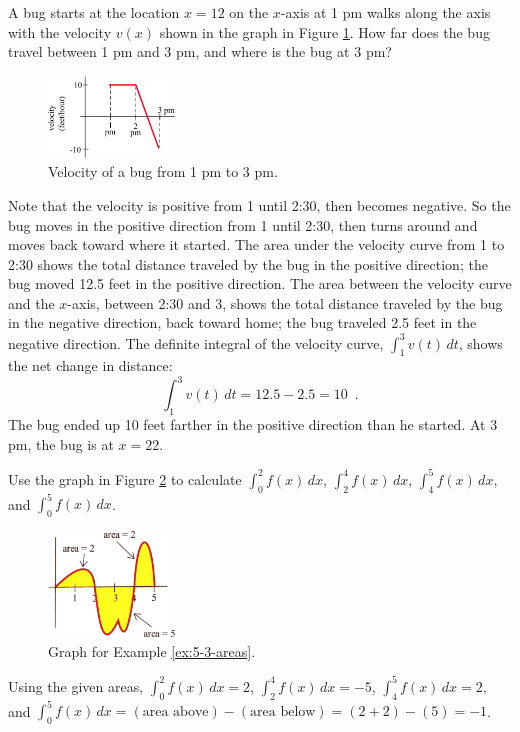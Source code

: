\begin{example}
A bug starts at the location $x=12$ on the $x$-axis at 1 pm walks along the axis with the velocity $v(x)$ shown in the graph in Figure \ref{fig:5-3-bug}. How far does the bug travel between 1 pm and 3 pm, and where is the bug at 3 pm?

\begin{figure}[!ht]
  \centering
    \includegraphics[width=0.3\textwidth]{img/chap5/image014.png}
    \caption{Velocity of a bug from 1 pm to 3 pm.}
    \label{fig:5-3-bug}
\end{figure}

\begin{solution}
Note that the velocity is positive from 1 until 2:30, then becomes negative. So the bug moves in the positive direction from 1 until 2:30, then turns around and moves back toward where it started. The area under the velocity curve from 1 to 2:30 shows the total distance traveled by the bug in the positive direction; the bug moved 12.5 feet in the positive direction. The area between the velocity curve and the $x$-axis, between 2:30 and 3, shows the total distance traveled by the bug in the negative direction, back toward home; the bug traveled 2.5 feet in the negative direction. The definite integral of the velocity curve, $\displaystyle\int_1^3v(t)\,dt$, shows the net change in distance:
$$\int_1^3v(t)\,dt = 12.5-2.5 = 10 \enspace .$$
The bug ended up 10 feet farther in the positive direction than he started. At 3 pm, the bug is at $x=22$.
\end{solution}\end{example}

\begin{example}
\label{ex:5-3-areas}
Use the graph in Figure \ref{fig:5-3-areas} to calculate $\displaystyle\int_0^2f(x)\,dx$, $\displaystyle\int_2^4f(x)\,dx$, $\displaystyle\int_4^5f(x)\,dx$, and $\displaystyle\int_0^5f(x)\,dx$.

\begin{figure}[!ht]
  \centering
    \includegraphics[width=0.3\textwidth]{img/chap5/image015.png}
    \caption{Graph for Example \ref{ex:5-3-areas}.}
    \label{fig:5-3-areas}
\end{figure}

\begin{solution}
Using the given areas, $\int_0^2f(x)\,dx = 2$, $\int_2^4f(x)\,dx = -5$, $\int_4^5f(x)\,dx = 2$, and $\int_0^5f(x)\,dx  = (\text{area above})-(\text{area below}) = (2+2)-(5)=-1$.
\end{solution}\end{example}
